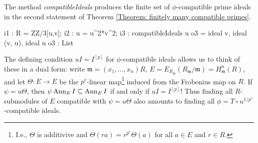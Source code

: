 \documentclass{amsart}
\begin{document}
The method \emph{compatibleIdeals} produces the finite set of $\phi$-compatible prime ideals in the second statement of Theorem \ref{Theorem: finitely many compatible primes}.

\medskip
{\small
\begin{MyVerbatim}
i1 : R = ZZ/3[u,v];
i2 : u = u^2*v^2;
i3 : compatibleIdeals u
o3 = {ideal v, ideal (v, u), ideal u}
o3 : List
\end{MyVerbatim}
}\medskip

The defining condition $u I = I^{[p]}$ for $\phi$-compatible ideals allows us to
think of these in a dual form: write $\mathfrak{m}=(x_1, \dots, x_n)R$,
$E=E_{R_\mathfrak{m}}(R_{\mathfrak{m}}/\mathfrak{m})=H^n_{\mathfrak{m}} (R)$, and let
$\Theta: E \rightarrow E$ be the $p^e$-linear map\footnote{I.e., $\Theta$ is additivive and $\Theta (r a)= r^{p^e} \Theta (a)$ for all $a\in E$ and $r\in R$.}
induced from the Frobenius map on $R$.
If $\psi=u \Theta$, then $\psi \operatorname{{Ann}}_E I \subseteq \operatorname{{Ann}}_E I$ if and only if $u I = I^{[p]}$!
Thus finding all $R$-submodules of $E$ compatible with $\psi=u \Theta$ also amounts to finding all
$\phi=T \circ u^{1/p^e}$-compatible ideals.
\end{document}
